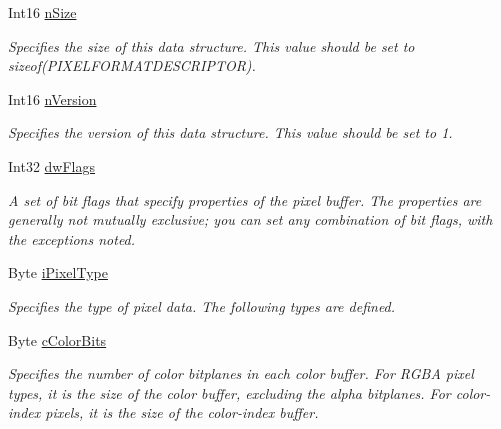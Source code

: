 \begin{DoxyCompactItemize}
\item 
Int16 \hyperlink{struct_tao_1_1_platform_1_1_windows_1_1_gdi_1_1_p_i_x_e_l_f_o_r_m_a_t_d_e_s_c_r_i_p_t_o_r_a5ae66abd3e766d17973ae05db44a4865}{nSize}
\begin{DoxyCompactList}\small\item\em Specifies the size of this data structure. This value should be set to {\ttfamily sizeof(PIXELFORMATDESCRIPTOR)}. \item\end{DoxyCompactList}\item 
Int16 \hyperlink{struct_tao_1_1_platform_1_1_windows_1_1_gdi_1_1_p_i_x_e_l_f_o_r_m_a_t_d_e_s_c_r_i_p_t_o_r_a64275a08e1cc1955f13d576eaf8667ca}{nVersion}
\begin{DoxyCompactList}\small\item\em Specifies the version of this data structure. This value should be set to 1. \item\end{DoxyCompactList}\item 
Int32 \hyperlink{struct_tao_1_1_platform_1_1_windows_1_1_gdi_1_1_p_i_x_e_l_f_o_r_m_a_t_d_e_s_c_r_i_p_t_o_r_af5fb7fa704eb45ea26aad410ab299f66}{dwFlags}
\begin{DoxyCompactList}\small\item\em A set of bit flags that specify properties of the pixel buffer. The properties are generally not mutually exclusive; you can set any combination of bit flags, with the exceptions noted. \item\end{DoxyCompactList}\item 
Byte \hyperlink{struct_tao_1_1_platform_1_1_windows_1_1_gdi_1_1_p_i_x_e_l_f_o_r_m_a_t_d_e_s_c_r_i_p_t_o_r_ae51ec99cf213a8bec317162fc313b34f}{iPixelType}
\begin{DoxyCompactList}\small\item\em Specifies the type of pixel data. The following types are defined. \item\end{DoxyCompactList}\item 
Byte \hyperlink{struct_tao_1_1_platform_1_1_windows_1_1_gdi_1_1_p_i_x_e_l_f_o_r_m_a_t_d_e_s_c_r_i_p_t_o_r_a5c0e0428c67157754e663f38482228ab}{cColorBits}
\begin{DoxyCompactList}\small\item\em Specifies the number of color bitplanes in each color buffer. For RGBA pixel types, it is the size of the color buffer, excluding the alpha bitplanes. For color-\/index pixels, it is the size of the color-\/index buffer. \item\end{DoxyCompactList}\item 

\end{DoxyCompactItemize}

